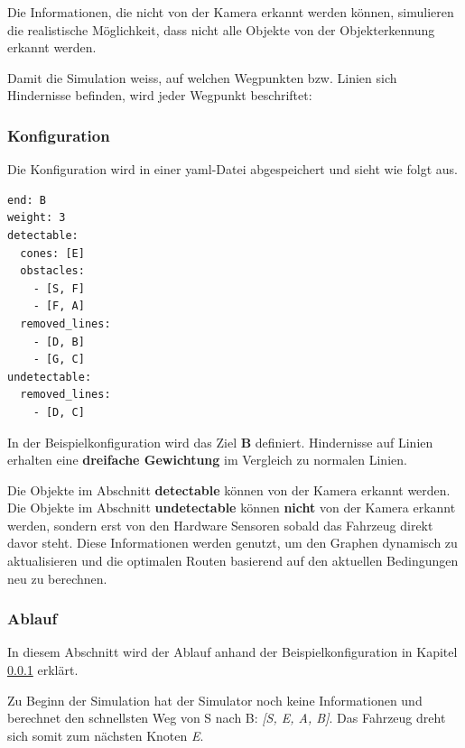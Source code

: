 \documentclass[../main.tex]{subfiles}
\begin{document}
Die Informationen, die nicht von der Kamera erkannt werden können, simulieren die realistische Möglichkeit, dass nicht alle Objekte von der Objekterkennung erkannt werden.  

Damit die Simulation weiss, auf welchen Wegpunkten bzw. Linien sich Hindernisse befinden, wird jeder Wegpunkt beschriftet:


\subsubsection{Konfiguration} \label{sim:Konfiguration}

Die Konfiguration wird in einer \acrshort{yaml}-Datei abgespeichert und sieht wie folgt aus.

\begin{verbatim}
end: B
weight: 3
detectable:
  cones: [E]
  obstacles: 
    - [S, F]
    - [F, A]
  removed_lines:
    - [D, B]
    - [G, C]
undetectable:
  removed_lines:
    - [D, C]
\end{verbatim}

In der Beispielkonfiguration wird das Ziel \textbf{B} definiert. Hindernisse auf Linien erhalten eine \textbf{dreifache Gewichtung} im Vergleich zu normalen Linien.

Die Objekte im Abschnitt \textbf{detectable} können von der Kamera erkannt werden.
Die Objekte im Abschnitt \textbf{undetectable} können \textbf{nicht} von der Kamera erkannt werden, sondern erst von den Hardware Sensoren sobald das Fahrzeug direkt davor steht.
Diese Informationen werden genutzt, um den Graphen dynamisch zu aktualisieren und die optimalen Routen basierend auf den aktuellen Bedingungen neu zu berechnen.

\subsubsection{Ablauf}

In diesem Abschnitt wird der Ablauf anhand der Beispielkonfiguration in Kapitel \ref{sim:Konfiguration} erklärt.

Zu Beginn der Simulation hat der Simulator noch keine Informationen und berechnet den schnellsten Weg von S nach B: \textit{[S, E, A, B]}. Das Fahrzeug dreht sich somit zum nächsten Knoten \textit{E}.

\end{document}
